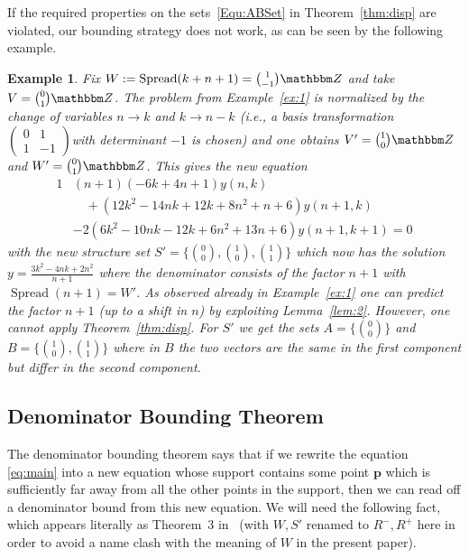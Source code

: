 \documentclass[a4paper]{sig-alternate}
\let\set\mathbbm
\def\vec#1{\mathbf{#1}}
\def\spread{\operatorname{Spread}}
\newtheorem{example}{Example}
\begin{document}
If the required properties on the sets~\eqref{Equ:ABSet} in Theorem~\ref{thm:disp} are violated, our bounding strategy does not work, as can be seen by the following example.

\begin{example}
Fix $W:=\spread(k+n+1)=\binom{1}{-1}\set Z$ and take
$V=\binom{0}{1}\set Z$. The problem from Example~\ref{ex:1} is normalized
by the change of variables $n\to k$ and $k\to n-k$ (i.e., a basis transformation \tiny$\left(\begin{matrix}
0&1\\
1&-1
\end{matrix}\right)$\normalsize with determinant $-1$ is chosen) and one obtains $V'=\binom{1}{0}\set Z$ and $W'=\binom{0}{1}\set Z$. This gives the new equation
  \begin{alignat*}1
    &(n+1) (-6 k+4 n+1) y(n,k)\\
    &\quad+(12 k^2-14 n k+12
   k+8 n^2+n+6)y(n+1,k)\\
    &-2(6 k^2-10 n k-12 k+6n^2+13 n+6)y(n+1,k+1)=0
  \end{alignat*}
with the new structure set $S'=\{\binom{0}{0},\binom{1}{0},\binom{1}{1}\}$
which now has the solution $y=\frac{3 k^2-4 n k+2 n^2}{n+1}$ where the denominator consists of the factor $n+1$ with $\spread(n+1)=W'$. As observed already in Example~\ref{ex:1} one can predict the factor $n+1$ (up to a shift in $n$) by exploiting Lemma~\ref{lem:2}. However, one cannot apply Theorem~\ref{thm:disp}. For $S'$ we get the sets $A=\{\binom{0}{0}\}$ and $B=\{\binom{1}{0},\binom{1}{1}\}$ where in $B$ the two vectors are the same in the first component but differ in the second component.
\end{example}

\subsection{Denominator Bounding Theorem}

The denominator bounding theorem says that if we rewrite the equation \eqref{eq:main} into
a new equation whose support contains some point $\vec p$ which is sufficiently far away from
all the other points in the support, then we can read off a denominator bound from this
new equation. We will need the following fact, which appears literally as Theorem~3 in~\cite{kauers10b}
(with $W,S'$ renamed to $R^-,R^+$ here in order to avoid a name clash with the meaning of $W$
in the present paper).
\end{document}
